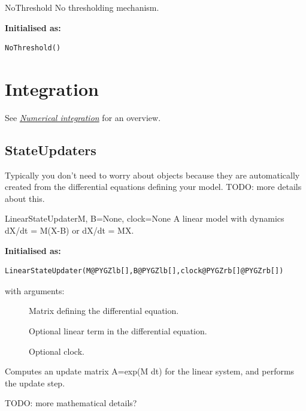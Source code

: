 \documentclass[letterpaper,10pt,english]{manual}
\begin{document}
\hypertarget{brian.NoThreshold}{}\begin{classdesc}{NoThreshold}{}
No thresholding mechanism.

\textbf{Initialised as:}

\begin{Verbatim}[commandchars=@\[\]]
NoThreshold()
\end{Verbatim}
\end{classdesc}

\resetcurrentobjects
\hypertarget{--doc-reference-integration}{}

\hypertarget{integration}{}\section{Integration}

See \hyperlink{numerical-integration}{\emph{Numerical integration}} for an overview.


\subsection{StateUpdaters}

Typically you don't need to worry about  objects
because they are automatically created from the differential
equations defining your model. TODO: more details about this.

\hypertarget{brian.LinearStateUpdater}{}\begin{classdesc}{LinearStateUpdater}{M, B=None, clock=None}
A linear model with dynamics dX/dt = M(X-B) or dX/dt = MX.

\textbf{Initialised as:}

\begin{Verbatim}[commandchars=@\[\]]
LinearStateUpdater(M@PYGZlb[],B@PYGZlb[],clock@PYGZrb[]@PYGZrb[])
\end{Verbatim}

with arguments:
\begin{description}
\item[]
Matrix defining the differential equation.

\item[]
Optional linear term in the differential equation.

\item[]
Optional clock.

\end{description}

Computes an update matrix A=exp(M dt) for the linear system,
and performs the update step.

TODO: more mathematical details?
\end{classdesc}
\end{document}

